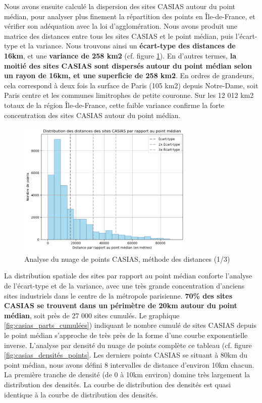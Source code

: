 \documentclass[a4paper,twoside,12pt]{book}
\begin{document}
Nous avons ensuite calculé la dispersion des sites CASIAS autour du point médian, pour analyser plus finement la répartition des points en Île-de-France, et vérifier son adéquation avec la loi d'agglomération. Nous avons produit une matrice des distances entre tous les sites CASIAS et le point médian, puis l'écart-type et la variance. Nous trouvons ainsi un \textbf{écart-type des distances de 16km}, et une \textbf{variance de 258 km2} (cf. figure \ref{fig:dist_casias_pointmedian_1}). En d'autres termes, \textbf{la moitié des sites CASIAS sont dispersés autour du point médian selon un rayon de 16km, et une superficie de 258 km2}. En ordres de grandeurs, cela correspond à deux fois la surface de Paris (105 km2) depuis Notre-Dame, soit Paris centre et les communes limitrophes de petite couronne. Sur les 12 012 km2 totaux de la région Île-de-France, cette faible variance confirme la forte concentration des sites CASIAS autour du point médian. 

 \begin{figure}[!h] 
\centering  
\includegraphics[width=0.75\textwidth]{img/chapitre3/CASIAS_Dispersion_Points_Centraux_1.png} 
\caption{Analyse du nuage de points CASIAS, méthode des distances (1/3)} 
\label{fig:dist_casias_pointmedian_1} 
\end{figure}

La distribution spatiale des sites par rapport au point médian conforte l'analyse de l'écart-type et de la variance, avec une très grande concentration d'anciens sites industriels dans le centre de la métropole parisienne. \textbf{70\% des sites CASIAS se trouvent dans un périmètre de 20km autour du point médian}, soit près de 27 000 sites cumulés. Le graphique \ref{fig:casias_parts_cumulées}) indiquant le nombre cumulé de sites CASIAS depuis le point médian s'approche de très près de la forme d'une courbe exponentielle inverse.  L'analyse par densité du nuage de points complète ce tableau (cf. figure \ref{fig:casias_densités_points}. Les derniers points CASIAS se situant à 80km du point médian, nous avons défini 8 intervalles de distance d'environ 10km chacun. La première tranche de densité (de 0 à 10km environ) domine très largement la distribution des densités. La courbe de distribution des densités est quasi identique à la courbe de distribution des densités.  
\end{document}
